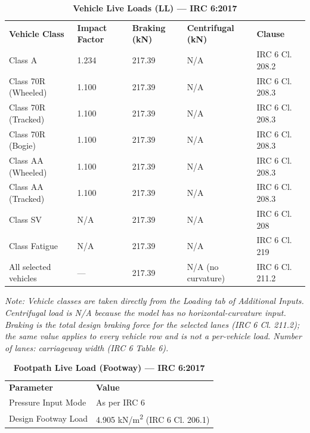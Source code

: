 \documentclass[12pt,a4paper]{report}
\numberwithin{table}{chapter}
\numberwithin{figure}{chapter}
\begin{document}
\vspace{1em}
\begin{longtable}{|L{3.8cm}|C{2.1cm}|C{2.2cm}|L{3.6cm}|L{3.0cm}|}
\caption{\textbf{Vehicle Live Loads (LL) --- IRC 6:2017}} \\
\hline
\endfirsthead
\hline
\caption{\textbf{Vehicle Live Loads (LL) --- IRC 6:2017}} \\
\hline
\endhead
\textbf{Vehicle Class} & \textbf{Impact Factor} & \textbf{Braking (kN)} & \textbf{Centrifugal (kN)} & \textbf{Clause} \\[6pt]
\hline
\textnormal{Class A} & 1.234 & 217.39 & \footnotesize N/A & IRC 6 Cl. 208.2 \\[6pt]
\hline
\textnormal{Class 70R (Wheeled)} & 1.100 & 217.39 & \footnotesize N/A & IRC 6 Cl. 208.3 \\[6pt]
\hline
\textnormal{Class 70R (Tracked)} & 1.100 & 217.39 & \footnotesize N/A & IRC 6 Cl. 208.3 \\[6pt]
\hline
\textnormal{Class 70R (Bogie)} & 1.100 & 217.39 & \footnotesize N/A & IRC 6 Cl. 208.3 \\[6pt]
\hline
\textnormal{Class AA (Wheeled)} & 1.100 & 217.39 & \footnotesize N/A & IRC 6 Cl. 208.3 \\[6pt]
\hline
\textnormal{Class AA (Tracked)} & 1.100 & 217.39 & \footnotesize N/A & IRC 6 Cl. 208.3 \\[6pt]
\hline
\textnormal{Class SV} & N/A & 217.39 & \footnotesize N/A & IRC 6 Cl. 208 \\[6pt]
\hline
\textnormal{Class Fatigue} & N/A & 217.39 & \footnotesize N/A & IRC 6 Cl. 219 \\[6pt]
\hline
\textnormal{All selected vehicles} & --- & 217.39 & \footnotesize N/A (no curvature) & \textnormal{IRC 6 Cl. 211.2} \\[6pt]
\hline
\end{longtable}

\noindent\textit{Note: Vehicle classes are taken directly from the Loading tab of Additional Inputs. Centrifugal load is N/A because the model has no horizontal-curvature input. Braking is the total design braking force for the selected lanes (IRC 6 Cl. 211.2); the same value applies to every vehicle row and is not a per-vehicle load. Number of lanes: carriageway width (IRC 6 Table 6).}

\vspace{1em}
\begin{longtable}{|L{5.5cm}|p{9.5cm}|}
\caption{\textbf{Footpath Live Load (Footway) --- IRC 6:2017}} \\
\hline
\endfirsthead
\hline
\caption{\textbf{Footpath Live Load (Footway) --- IRC 6:2017}} \\
\hline
\endhead
\textbf{Parameter} & \textbf{Value} \\
\hline
\textnormal{Pressure Input Mode} & As per IRC 6 \\[6pt]
\hline
\textnormal{Design Footway Load} & 4.905 kN/m\textsuperscript{2} (IRC 6 Cl. 206.1) \\[6pt]
\hline
\end{longtable}
\end{document}
